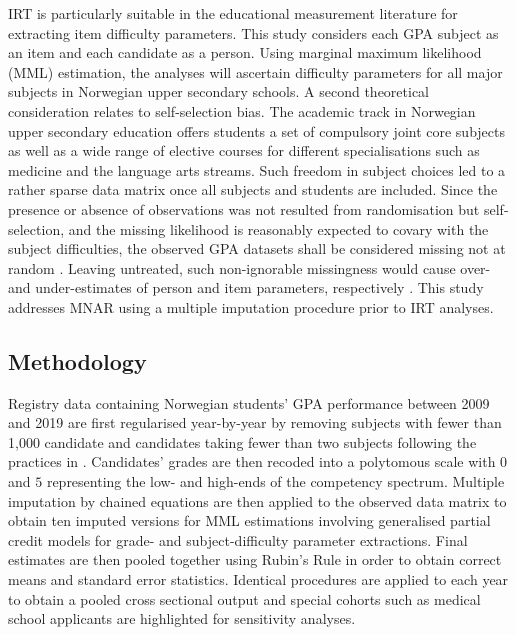 IRT is particularly suitable in the educational measurement literature for extracting item difficulty parameters. This study considers each GPA subject as an item and each candidate as a person. Using marginal maximum likelihood (MML) estimation, the analyses will ascertain difficulty parameters for all major subjects in Norwegian upper secondary schools. A second theoretical consideration relates to self-selection bias. The academic track in Norwegian upper secondary education offers students a set of compulsory joint core subjects as well as a wide range of elective courses for different specialisations such as medicine and the language arts streams. Such freedom in subject choices led to a rather sparse data matrix once all subjects and students are included. Since the presence or absence of observations was not resulted from randomisation but self-selection, and the missing likelihood is reasonably expected to covary with the subject difficulties, the observed GPA datasets shall be considered missing not at random \parencite[MNAR,][]{rubin:1976}. Leaving untreated, such non-ignorable missingness would cause over- and under-estimates of person and item parameters, respectively \parencite{rose:2013}. This study addresses MNAR using a multiple imputation procedure prior to IRT analyses.

\subsection{Methodology}

Registry data containing Norwegian students' GPA performance between 2009 and 2019 are first regularised year-by-year by removing subjects with fewer than 1,000 candidate and candidates taking fewer than two subjects following the practices in \textcite{he:2018}. Candidates' grades are then recoded into a polytomous scale with $0$ and $5$ representing the low- and high-ends of the competency spectrum. Multiple imputation by chained equations \parencite{vanbuuren:2011} are then applied to the observed data matrix to obtain ten imputed versions for MML estimations involving generalised partial credit models \parencite[GPCM,][]{muraki:1992} for grade- and subject-difficulty parameter extractions. Final estimates are then pooled together using Rubin's Rule \parencite{rubin:1987} in order to obtain correct means and standard error statistics. Identical procedures are applied to each year to obtain a pooled cross sectional output and special cohorts such as medical school applicants are highlighted for sensitivity analyses.

